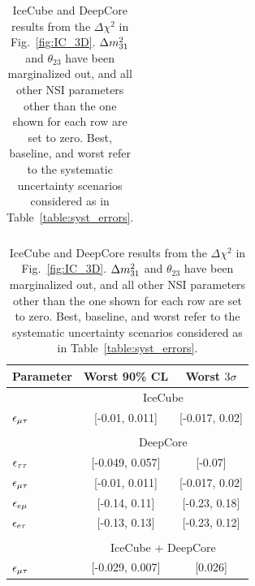 {{\begin{table}
\begin{center}
\begin{tabular}{lcc}
      \end{tabular}
      \begin{tabular}{lcc}
         \hline
         Parameter & Worst 90\% CL & Worst $3\sigma$\\
         \hline & \multicolumn{2}{c}{IceCube}  \\
         $\epsilon_{\mu\tau}$ &   [-0.01, 0.011] &   [-0.017, 0.02] \\\\
         & \multicolumn{2}{c}{DeepCore}\\ [0.3em]
         $\epsilon_{\tau\tau}$ &    [-0.049, 0.057] &          [-0.07] \\
         $\epsilon_{\mu\tau}$ &     [-0.01, 0.011] &   [-0.017, 0.02] \\
         $\epsilon_{e\mu}$ &   [-0.14, 0.11] &   [-0.23, 0.18] \\
         $\epsilon_{e\tau}$ &   [-0.13, 0.13] &  [-0.23, 0.12] \\\\
         &\multicolumn{2}{c}{IceCube + DeepCore}\\
         $\epsilon_{\mu\tau}$ &   [-0.029, 0.007] &          [0.026] \\
         \hline
      \end{tabular}
      \caption{IceCube and DeepCore results from the $\Delta \chi^2$ in Fig.~\ref{fig:IC_3D}. $\dm[31]$ and $\theta_{23}$ have been marginalized out, and all other NSI parameters other than the one shown for each row are set to zero. Best, baseline, and worst refer to 
      the systematic uncertainty scenarios considered as in Table~\ref{table:syst_errors}.}\label{table:IC_DC_results}
   \end{center}
\end{table}

}}
